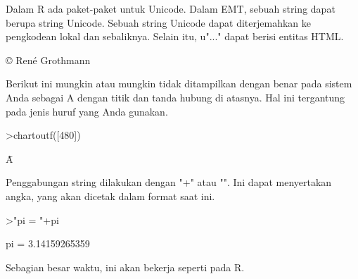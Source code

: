 \documentclass[12pt,Times new roman,letterpaper]{book}
\begin{document}
\begin{eulernootebook}
\begin{eulercomment}
\begin{eulercomment}
\begin{eulernootebook}
\begin{eulercomment}
\begin{eulercomment}
\begin{eulercomment}
\begin{eulercomment}
\begin{eulercomment}
\begin{eulercomment}
\begin{eulercomment}
\begin{eulercomment}
\begin{eulercomment}
\begin{eulercomment}
\begin{eulercomment}
\begin{eulercomment}
Dalam R ada paket-paket untuk Unicode. Dalam EMT, sebuah string dapat
berupa string Unicode. Sebuah string Unicode dapat diterjemahkan ke
pengkodean lokal dan sebaliknya. Selain itu, u"..." dapat berisi
entitas HTML.
\end{eulercomment}
\begin{euleroutput}
  © René Grothmann
\end{euleroutput}
\begin{eulercomment}
Berikut ini mungkin atau mungkin tidak ditampilkan dengan benar pada
sistem Anda sebagai A dengan titik dan tanda hubung di atasnya. Hal
ini tergantung pada jenis huruf yang Anda gunakan.
\end{eulercomment}
\begin{eulerprompt}
>chartoutf([480])
\end{eulerprompt}
\begin{euleroutput}
  Ǡ
\end{euleroutput}
\begin{eulercomment}
Penggabungan string dilakukan dengan "+" atau "\textbar{}". Ini dapat
menyertakan angka, yang akan dicetak dalam format saat ini.
\end{eulercomment}
\begin{eulerprompt}
>"pi = "+pi
\end{eulerprompt}
\begin{euleroutput}
  pi = 3.14159265359
\end{euleroutput}
\begin{eulercomment}
Sebagian besar waktu, ini akan bekerja seperti pada R.


\end{eulercomment}
\end{eulercomment}
\end{eulercomment}
\end{eulercomment}
\end{eulercomment}
\end{eulercomment}
\end{eulercomment}
\end{eulercomment}
\end{eulercomment}
\end{eulercomment}
\end{eulercomment}
\end{eulercomment}
\end{eulernootebook}
\end{eulercomment}
\end{eulercomment}
\end{eulernootebook}
\end{document}
